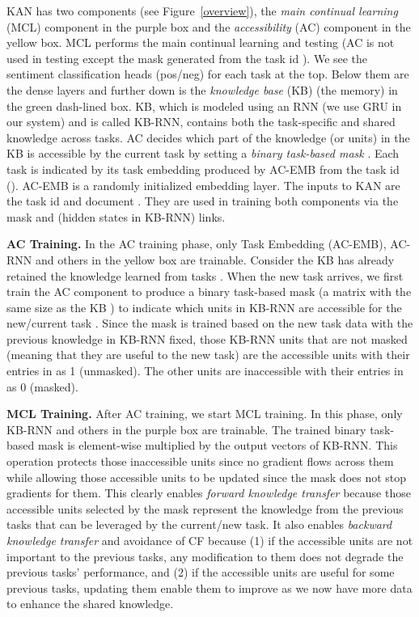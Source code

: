\documentclass[runningheads]{llncs}
\begin{document}
KAN has two components (see Figure~\ref{overview}), 
the {\em main continual learning} (MCL) component in the purple box and the {\em accessibility} (AC) component in the yellow box. MCL performs the main continual learning and testing (AC is not used in testing except the mask  generated from the task id ). We see the sentiment classification heads (pos/neg) for each task at the top. Below them are the dense layers and further down is the \textit{knowledge base} (KB) (the memory) in the green dash-lined box. KB, which is modeled using an RNN (we use GRU in our system) and is called KB-RNN, contains both the task-specific and shared knowledge across tasks. AC decides which part of the knowledge (or units) in the KB is accessible by the current task  by setting a {\color{black}\textit{binary task-based mask}} . Each task is indicated by its task embedding produced by AC-EMB from the task id (). AC-EMB is a randomly initialized embedding layer. The inputs to KAN are the task id  and document . They are used in training both components via the mask  and  (hidden states in KB-RNN) links. 

\vspace{+4mm}
\noindent
\textbf{AC Training.} In the AC training phase, only Task Embedding (AC-EMB), AC-RNN and others in the yellow box are trainable. Consider the KB has already retained the knowledge learned from tasks . When the new task  arrives, we first train the AC component to produce a binary task-based mask  (a matrix with the same size as the KB ) to indicate which units in KB-RNN are accessible for the new/current task . Since the mask is trained based on the new task data with the previous knowledge in KB-RNN fixed, those KB-RNN units that are not masked (meaning that they are useful to the new task) are the accessible units with their entries in  as 1 (unmasked). The other units are inaccessible with their entries in  as 0 (masked). 

\vspace{+4mm}
\noindent
\textbf{MCL Training.} After AC training, we start MCL training. In this phase, only KB-RNN and others in the purple box are trainable. The trained binary task-based mask  is element-wise multiplied by the output vectors of KB-RNN. This operation protects those inaccessible units since no gradient flows across them while allowing those accessible units to be updated since the mask does not stop gradients for them. This clearly enables \textit{forward knowledge transfer} because those accessible units selected by the mask represent the knowledge from the previous tasks that can be leveraged by the current/new task.  It also enables {\color{black}\textit{backward knowledge transfer} and avoidance of CF} because (1) if the accessible units are not important to the previous tasks, any modification to them does not degrade the previous tasks' performance, and (2) if the accessible units are useful for some previous tasks, updating them enable them to improve as we now have more data to enhance the shared knowledge. 
\end{document}
